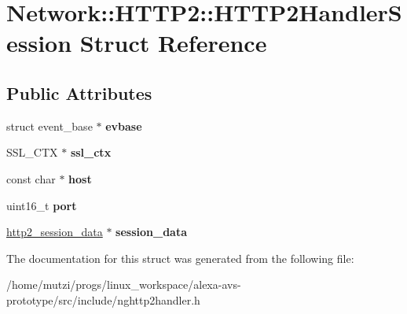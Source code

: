 \hypertarget{structNetwork_1_1HTTP2_1_1HTTP2HandlerSession}{}\section{Network\+:\+:H\+T\+T\+P2\+:\+:H\+T\+T\+P2\+Handler\+Session Struct Reference}
\label{structNetwork_1_1HTTP2_1_1HTTP2HandlerSession}
\subsection*{Public Attributes}
\begin{DoxyCompactItemize}
\item 
\mbox{\label{structNetwork_1_1HTTP2_1_1HTTP2HandlerSession_a0a6fe64e74c8bd333711aa30adb962d3}} 
struct event\+\_\+base $\ast$ {\bfseries evbase}
\item 
\mbox{\label{structNetwork_1_1HTTP2_1_1HTTP2HandlerSession_ac67e4db1227721ac0026af3e9267bc2b}} 
S\+S\+L\+\_\+\+C\+TX $\ast$ {\bfseries ssl\+\_\+ctx}
\item 
\mbox{\label{structNetwork_1_1HTTP2_1_1HTTP2HandlerSession_a72dfa7a89e3b0b7c6659527fa1fb20f4}} 
const char $\ast$ {\bfseries host}
\item 
\mbox{\label{structNetwork_1_1HTTP2_1_1HTTP2HandlerSession_ad4b26b5c59e4f67612cfb9c129c361a2}} 
uint16\+\_\+t {\bfseries port}
\item 
\mbox{\label{structNetwork_1_1HTTP2_1_1HTTP2HandlerSession_a660d8104cefc3d346dbe3ddfeac26a79}} 
\hyperlink{structNetwork_1_1HTTP2_1_1http2__session__data}{http2\+\_\+session\+\_\+data} $\ast$ {\bfseries session\+\_\+data}
\end{DoxyCompactItemize}


The documentation for this struct was generated from the following file\+:\begin{DoxyCompactItemize}
\item 
/home/mutzi/progs/linux\+\_\+workspace/alexa-\/avs-\/prototype/src/include/nghttp2handler.\+h\end{DoxyCompactItemize}
